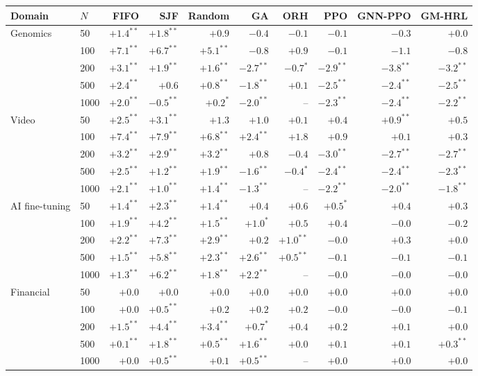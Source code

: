 \begin{tabular}{llrrrrrrrr}
\toprule
Domain & $N$ & FIFO & SJF & Random & GA & ORH & PPO & GNN-PPO & GM-HRL \\
\midrule
Genomics & 50 & $+1.4^{**}$ & $+1.8^{**}$ & $+0.9$ & $\mathbf{-0.4}$ & $-0.1$ & $-0.1$ & $-0.3$ & $+0.0$ \\
 & 100 & $+7.1^{**}$ & $+6.7^{**}$ & $+5.1^{**}$ & $-0.8$ & $+0.9$ & $-0.1$ & $\mathbf{-1.1}$ & $-0.8$ \\
 & 200 & $+3.1^{**}$ & $+1.9^{**}$ & $+1.6^{**}$ & $-2.7^{**}$ & $-0.7^{*}$ & $-2.9^{**}$ & $\mathbf{-3.8^{**}}$ & $-3.2^{**}$ \\
 & 500 & $+2.4^{**}$ & $+0.6$ & $+0.8^{**}$ & $-1.8^{**}$ & $+0.1$ & $-2.5^{**}$ & $-2.4^{**}$ & $\mathbf{-2.5^{**}}$ \\
 & 1000 & $+2.0^{**}$ & $-0.5^{**}$ & $+0.2^{*}$ & $-2.0^{**}$ & -- & $-2.3^{**}$ & $\mathbf{-2.4^{**}}$ & $-2.2^{**}$ \\
\midrule
Video & 50 & $+2.5^{**}$ & $+3.1^{**}$ & $+1.3$ & $+1.0$ & $+0.1$ & $+0.4$ & $+0.9^{**}$ & $+0.5$ \\
 & 100 & $+7.4^{**}$ & $+7.9^{**}$ & $+6.8^{**}$ & $+2.4^{**}$ & $+1.8$ & $+0.9$ & $+0.1$ & $+0.3$ \\
 & 200 & $+3.2^{**}$ & $+2.9^{**}$ & $+3.2^{**}$ & $+0.8$ & $-0.4$ & $\mathbf{-3.0^{**}}$ & $-2.7^{**}$ & $-2.7^{**}$ \\
 & 500 & $+2.5^{**}$ & $+1.2^{**}$ & $+1.9^{**}$ & $-1.6^{**}$ & $-0.4^{*}$ & $\mathbf{-2.4^{**}}$ & $-2.4^{**}$ & $-2.3^{**}$ \\
 & 1000 & $+2.1^{**}$ & $+1.0^{**}$ & $+1.4^{**}$ & $-1.3^{**}$ & -- & $\mathbf{-2.2^{**}}$ & $-2.0^{**}$ & $-1.8^{**}$ \\
\midrule
AI fine-tuning & 50 & $+1.4^{**}$ & $+2.3^{**}$ & $+1.4^{**}$ & $+0.4$ & $+0.6$ & $+0.5^{*}$ & $+0.4$ & $+0.3$ \\
 & 100 & $+1.9^{**}$ & $+4.2^{**}$ & $+1.5^{**}$ & $+1.0^{*}$ & $+0.5$ & $+0.4$ & $-0.0$ & $\mathbf{-0.2}$ \\
 & 200 & $+2.2^{**}$ & $+7.3^{**}$ & $+2.9^{**}$ & $+0.2$ & $+1.0^{**}$ & $\mathbf{-0.0}$ & $+0.3$ & $+0.0$ \\
 & 500 & $+1.5^{**}$ & $+5.8^{**}$ & $+2.3^{**}$ & $+2.6^{**}$ & $+0.5^{**}$ & $-0.1$ & $\mathbf{-0.1}$ & $-0.1$ \\
 & 1000 & $+1.3^{**}$ & $+6.2^{**}$ & $+1.8^{**}$ & $+2.2^{**}$ & -- & $\mathbf{-0.0}$ & $-0.0$ & $-0.0$ \\
\midrule
Financial & 50 & $+0.0$ & $+0.0$ & $+0.0$ & $+0.0$ & $+0.0$ & $+0.0$ & $+0.0$ & $+0.0$ \\
 & 100 & $+0.0$ & $+0.5^{**}$ & $+0.2$ & $+0.2$ & $+0.2$ & $-0.0$ & $-0.0$ & $\mathbf{-0.1}$ \\
 & 200 & $+1.5^{**}$ & $+4.4^{**}$ & $+3.4^{**}$ & $+0.7^{*}$ & $+0.4$ & $+0.2$ & $+0.1$ & $+0.0$ \\
 & 500 & $+0.1^{**}$ & $+1.8^{**}$ & $+0.5^{**}$ & $+1.6^{**}$ & $+0.0$ & $+0.1$ & $+0.1$ & $+0.3^{**}$ \\
 & 1000 & $+0.0$ & $+0.5^{**}$ & $+0.1$ & $+0.5^{**}$ & -- & $+0.0$ & $+0.0$ & $+0.0$ \\
\bottomrule
\end{tabular}
